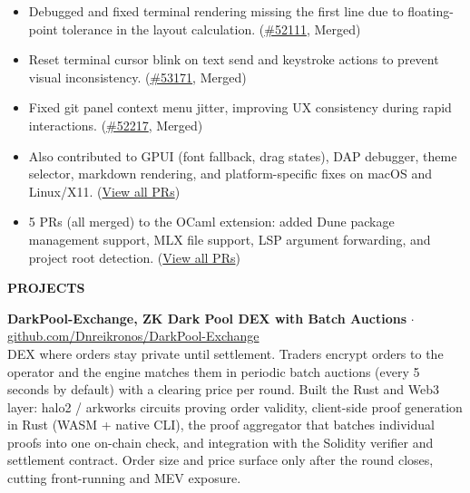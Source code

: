\documentclass[10pt,a4paper]{article}
\newcommand{\cvsection}[1]{%
    \vspace{8pt}%
    {\large\bfseries\uppercase{#1}}\\[2pt]%
    \vspace{2pt}%
}
\begin{document}
\begin{itemize}
    \item {\footnotesize Debugged and fixed terminal rendering missing the first line due to floating-point tolerance in the layout calculation. (\href{https://github.com/zed-industries/zed/pull/52111}{\#52111}, Merged)}
    \item {\footnotesize Reset terminal cursor blink on text send and keystroke actions to prevent visual inconsistency. (\href{https://github.com/zed-industries/zed/pull/53171}{\#53171}, Merged)}
    \item {\footnotesize Fixed git panel context menu jitter, improving UX consistency during rapid interactions. (\href{https://github.com/zed-industries/zed/pull/52217}{\#52217}, Merged)}
    \item {\footnotesize Also contributed to GPUI (font fallback, drag states), DAP debugger, theme selector, markdown rendering, and platform-specific fixes on macOS and Linux/X11. (\href{https://github.com/zed-industries/zed/pulls?q=author\%3ADnreikronos}{View all PRs})}
    \item {\footnotesize 5 PRs (all merged) to the OCaml extension: added Dune package management support, MLX file support, LSP argument forwarding, and project root detection. (\href{https://github.com/zed-extensions/ocaml/pulls?q=author\%3ADnreikronos}{View all PRs})}
\end{itemize}

\cvsection{Projects}

\noindent\textbf{\footnotesize DarkPool-Exchange, ZK Dark Pool DEX with Batch Auctions} {\footnotesize $\cdot$ \href{https://github.com/Dnreikronos/DarkPool-Exchange}{github.com/Dnreikronos/DarkPool-Exchange}}\\
{\footnotesize DEX where orders stay private until settlement. Traders encrypt orders to the operator and the engine matches them in periodic batch auctions (every 5 seconds by default) with a clearing price per round. Built the Rust and Web3 layer: halo2 / arkworks circuits proving order validity, client-side proof generation in Rust (WASM + native CLI), the proof aggregator that batches individual proofs into one on-chain check, and integration with the Solidity verifier and settlement contract. Order size and price surface only after the round closes, cutting front-running and MEV exposure.}
\end{document}
